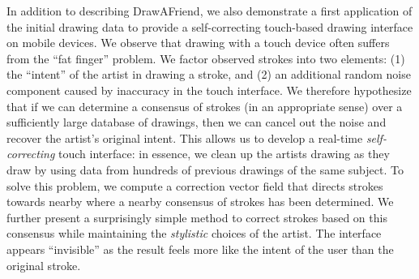 In addition to describing DrawAFriend, we also demonstrate a first
application of the initial drawing data to provide a self-correcting
touch-based drawing interface on mobile devices. We observe that
drawing with a touch device often suffers from the ``fat finger''
problem. We factor observed strokes into two elements: (1) the ``intent''
of the artist in drawing a stroke, and (2) an additional random
noise component caused by inaccuracy in the touch interface. We
therefore hypothesize that if we can determine a consensus of strokes (in an
appropriate sense) over a sufficiently large database of drawings,
then we can cancel out the noise and recover the artist's original intent.
This allows us to develop a real-time {\em self-correcting}
touch interface: in essence, we clean up the artists drawing as they draw
by using data from hundreds of previous drawings of the same
subject. To solve this problem, we compute a correction vector field
that directs strokes towards nearby where a nearby consensus of strokes has been
determined. We further present a surprisingly simple method to
correct strokes based on this consensus while maintaining the {\em stylistic}
choices of the artist. The interface appears ``invisible'' as the result
feels more like the intent of the user than the original stroke.








